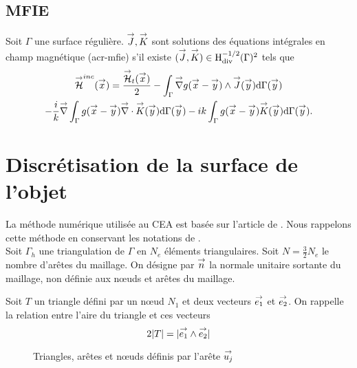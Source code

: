     \subsection{MFIE}
      \begin{prop}
        \label{eq:form_int:MFIE}
        Soit \(\Gamma\) une surface régulière.
        \(\vJ,\vK\) sont solutions des équations intégrales en champ magnétique (\gls{acr-mfie}) s'il existe \((\vJ,\vK) \in \Hdiv^{-1/2}(\Gamma)^2\) tels que
        \begin{multline*}
          \vH^{inc}(\vx) =
          \frac{\vH_t(\vx)}{2}
            - \int_{\Gamma} \vgrad g(\vx - \vy) \pvect \vJ(\vy) \dd{\Gamma}(\vy) \\
          - \frac{i}{k} \vgrad \int_{\Gamma}  g(\vx - \vy)\vdiv\vK(\vy)\dd{\Gamma}(\vy)
            - ik \int_{\Gamma} g(\vx - \vy)\vK(\vy)\dd{\Gamma}(\vy).
        \end{multline*}
      \end{prop}

\section{Discrétisation de la surface de l'objet}

  La méthode numérique utilisée au CEA  est basée sur l'article de \cite{medgyesi-mitschang_integral_1985}.
  Nous rappelons cette méthode en conservant les notations de \cite{stupfel_implementation_2015}.\\

  Soit \(\Gamma_h\) une triangulation de \(\Gamma\) en \(N_e\) éléments triangulaires.
  Soit \(N=\frac{3}{2}N_e\) le nombre d'arêtes du maillage.
  On désigne par \(\vn\) la normale unitaire sortante du maillage, non définie aux nœuds et arêtes du maillage.

  Soit \(T\) un triangle défini par un nœud \(N_1\) et deux vecteurs \(\vect{e_1}\) et \(\vect{e_2}\).
  On rappelle la relation entre l'aire du triangle et ces vecteurs
  \begin{equation*}
    2|T| = |\vect{e_1}\pvect\vect{e_2}|
  \end{equation*}

  \newcommand{\ncouche}{6}
  \newcommand{\setnodes}[6]{
      \renewcommand{\xa}{#1}
      \renewcommand{\ya}{#2}
      \renewcommand{\xb}{#3}
      \renewcommand{\yb}{#4}
      \renewcommand{\xc}{#5}
      \renewcommand{\yc}{#6}
  }
  \newcommand{\xa}{0.0}
  \newcommand{\ya}{0.0}
  \newcommand{\xb}{3.0}
  \newcommand{\yb}{0.0}
  \newcommand{\xc}{0.0}
  \newcommand{\yc}{3.0}
  \begin{figure}[h!tb]
    \begin{center}
      \begin{tikzpicture}[scale=1]
        
      \end{tikzpicture}
    \end{center}
    \caption[Conventions de notations de l'élément de référence]{Triangles, arêtes et nœuds définis par l'arête \(\uj\)}
    \label{fig:form_int:fon_base:tri}
  \end{figure}

